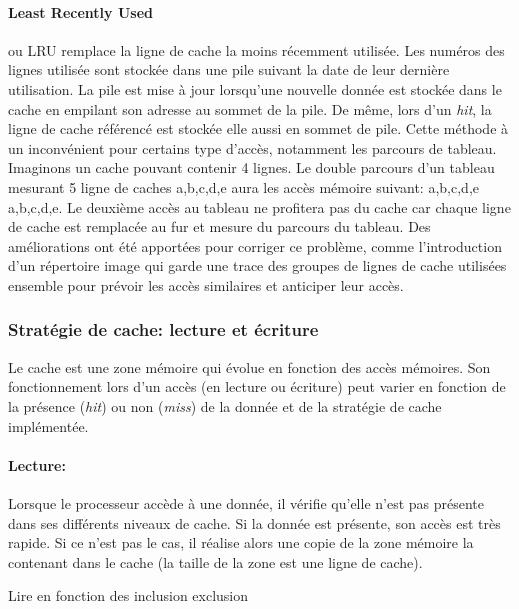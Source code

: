 \paragraph{Least Recently Used} ou LRU remplace la ligne de cache la moins récemment utilisée. Les numéros des lignes utilisée sont stockée dans une pile suivant la date de leur dernière utilisation. La pile est mise à jour lorsqu'une nouvelle donnée est stockée dans le cache en empilant son adresse au sommet de la pile. De même, lors d'un \textit{hit}, la ligne de cache référencé est stockée elle aussi en sommet de pile. Cette méthode à un inconvénient pour certains type d'accès, notamment les parcours de tableau. Imaginons un cache pouvant contenir 4 lignes. Le double parcours d'un tableau mesurant 5 ligne de caches a,b,c,d,e aura les accès mémoire suivant: a,b,c,d,e a,b,c,d,e. Le deuxième accès au tableau ne profitera pas du cache car chaque ligne de cache est remplacée au fur et mesure du parcours du tableau. Des améliorations ont été apportées pour corriger ce problème, comme l'introduction d'un répertoire image \cite{Stone:1987:HCA:31845} qui garde une trace des groupes de lignes de cache utilisées ensemble pour prévoir les accès similaires et anticiper leur accès.






\subsubsection{Stratégie de cache: lecture et écriture}

Le cache est une zone mémoire qui évolue en fonction des accès mémoires. Son fonctionnement lors d'un accès (en lecture ou écriture) peut varier en fonction de la présence (\textit{hit}) ou non (\textit{miss}) de la donnée et de la stratégie de cache implémentée.

\paragraph{Lecture:}  Lorsque le processeur accède à une donnée, il vérifie qu’elle n’est pas présente dans ses différents niveaux de cache. Si la donnée est présente, son accès est très rapide. Si ce n’est pas le cas, il réalise alors une copie de la zone mémoire la contenant dans le cache (la taille de la zone est une ligne de cache).

Lire en fonction des inclusion exclusion


